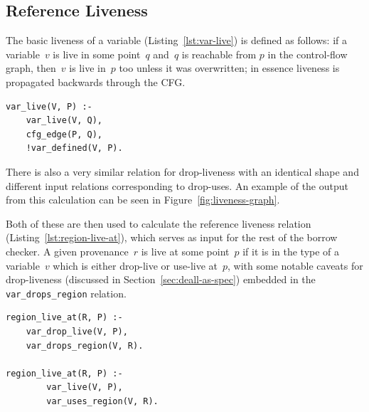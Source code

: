 \documentclass[11pt,a4paper,twoside,openany]{report}
\newenvironment{sourcecode}{\captionsetup{type=listing}}{}
\newcommand{\InDatalog}[1]{\texttt{#1}}
\begin{document}
\subsection{Reference Liveness}
\label{sec:var-livenes}

The basic liveness of a variable (Listing~\ref{lst:var-live}) is defined as
follows: if a variable~$v$ is live in some point~$q$ and~$q$ is reachable from
$p$ in the control-flow graph, then~$v$ is live in~$p$ too unless it was
overwritten; in essence liveness is propagated backwards through the CFG.

\begin{sourcecode}
  \label{lst:var-live}
\begin{verbatim}
var_live(V, P) :-
    var_live(V, Q),
    cfg_edge(P, Q),
    !var_defined(V, P).
\end{verbatim}
\end{sourcecode}


There is also a very similar relation for drop-liveness with an identical shape
and different input relations corresponding to drop-uses. An example of the
output from this calculation can be seen in Figure~\ref{fig:liveness-graph}.

Both of these are then used to calculate the reference liveness relation
(Listing~\ref{lst:region-live-at}), which serves as input for the rest of the
borrow checker. A given provenance~$r$ is live at some point~$p$ if it is in the
type of a variable~$v$ which is either drop-live or use-live at~$p$, with some
notable caveats for drop-liveness (discussed in Section~\ref{sec:deall-as-spec})
embedded in the \InDatalog{var_drops_region} relation.

\begin{sourcecode}
  \label{lst:region-live-at}
\begin{verbatim}
region_live_at(R, P) :-
    var_drop_live(V, P),
    var_drops_region(V, R).
        
region_live_at(R, P) :-
        var_live(V, P),
        var_uses_region(V, R).
\end{verbatim}
\end{sourcecode}
\end{document}

